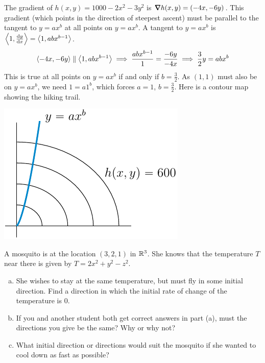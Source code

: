 \begin{solution}
 The gradient of $h(x,y)=1000-2x^2-3y^2$ is 
$\vnabla h(x,y)=(-4x,-6y)$. This gradient (which points in the direction
of steepest ascent) must be parallel to the tangent to $y=ax^b$ at all
points on $y=ax^b$. A tangent to $y=ax^b$ is $\llt 1,\diff{y}{x}\rgt
=\llt 1, abx^{b-1}\rgt$. 
\begin{equation*}
\left< -4x,-6y\right> \parallel \left< 1, abx^{b-1}\right>
\implies \frac{abx^{b-1}}{1}=\frac{-6y}{-4x}
\implies \frac{3}{2}y=abx^b
\end{equation*}
This is true at all points on $y=ax^b$ if and only if $b=\frac{3}{2}$.
As $(1,1)$ must also be on $y=ax^b$, we need $1=a1^b$, which forces
$a=1$, $b=\frac{3}{2}$. Here is a contour map showing the hiking trail.
\begin{center}
     \includegraphics{fig/hiker.pdf}
\end{center}
\end{solution}



\begin{question}[M200 2007A] %
A mosquito is at the location $(3, 2, 1)$ in $\mathbb{R}^3$. 
She knows that the temperature $T$ near there is given by 
$T = 2x^2 + y^2 - z^2$.
\begin{enumerate}[(a)]
\item
She wishes to stay at the same temperature, but must fly in some 
initial direction. Find a direction in which the initial rate of 
change of the temperature is $0$.

\item
 If you and another student both get correct answers in part (a), 
must the directions you give be the same? Why or why not?

\item 
What initial direction or directions would suit the mosquito if 
she wanted to cool down as fast as possible?
\end{enumerate}
\end{question}


